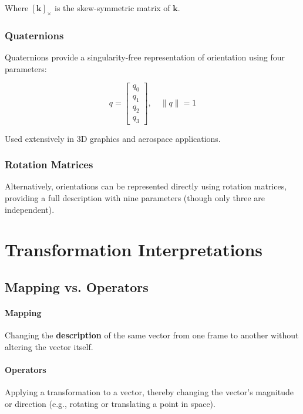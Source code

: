 \documentclass{article}
\begin{document}
Where $[\mathbf{k}]_\times$ is the skew-symmetric matrix of $\mathbf{k}$.

\subsubsection{Quaternions}

Quaternions provide a singularity-free representation of orientation using four parameters:

$$
q = \begin{bmatrix}
q_0 \\ q_1 \\ q_2 \\ q_3
\end{bmatrix}, \quad \| q \| = 1
$$

Used extensively in 3D graphics and aerospace applications.

\subsubsection{Rotation Matrices}

Alternatively, orientations can be represented directly using rotation matrices, providing a full description with nine parameters (though only three are independent).

\section{Transformation Interpretations}

\subsection{Mapping vs. Operators}

\paragraph{Mapping}

Changing the \textbf{description} of the same vector from one frame to another without altering the vector itself.

\paragraph{Operators}

Applying a transformation to a vector, thereby changing the vector's magnitude or direction (e.g., rotating or translating a point in space).
\end{document}
